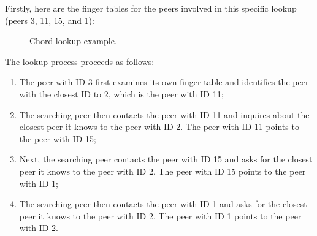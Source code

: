 Firstly, here are the finger tables for the peers involved in this specific lookup (peers 3, 11, 15, and 1):
\begin{figure}[htbp]
    \centering
    \caption{Chord lookup example.}
    \label{fig:chord-ring-16-peers-lookup-example}
\end{figure}

The lookup process proceeds as follows:
\begin{enumerate}
    \item The peer with ID 3 first examines its own finger table and identifies the peer with the closest ID to 2, which is the peer with ID 11;
	\item The searching peer then contacts the peer with ID 11 and inquires about the closest peer it knows to the peer with ID 2. The peer with ID 11 points to the peer with ID 15;
	\item Next, the searching peer contacts the peer with ID 15 and asks for the closest peer it knows to the peer with ID 2. The peer with ID 15 points to the peer with ID 1;
	\item The searching peer then contacts the peer with ID 1 and asks for the closest peer it knows to the peer with ID 2. The peer with ID 1 points to the peer with ID 2.
\end{enumerate}


